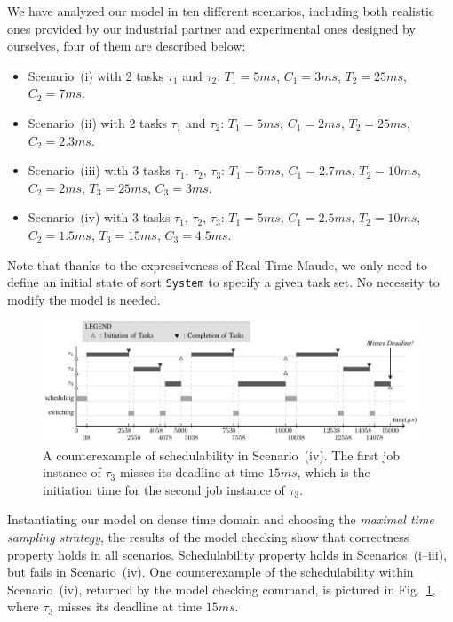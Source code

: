 \documentclass[12pt,onecolumn]{IEEEtranTIE}
\begin{document}
We have analyzed our model in ten different scenarios, including both
realistic ones provided by our industrial partner and experimental
ones designed by ourselves, four of them are described below:
\begin{itemize}
\item Scenario~(i) with 2 tasks $\tau_1$ and $\tau_2$: $T_1=5ms$,
  $C_1=3ms$, $T_2=25ms$, $C_2=7ms$.
\item Scenario~(ii) with 2 tasks $\tau_1$ and $\tau_2$: $T_1=5ms$,
  $C_1=2ms$, $T_2=25ms$, $C_2=2.3ms$.
\item Scenario~(iii) with 3 tasks $\tau_1$, $\tau_2$, $\tau_3$:
  $T_1=5ms$, $C_1=2.7ms$, $T_2=10ms$, $C_2=2ms$, $T_3=25ms$,
  $C_3=3ms$.
\item Scenario~(iv) with 3 tasks $\tau_1$, $\tau_2$, $\tau_3$:
  $T_1=5ms$, $C_1=2.5ms$, $T_2=10ms$, $C_2=1.5ms$,
  $T_3=15ms$, $C_3=4.5ms$.
\end{itemize}
Note that thanks to the expressiveness of Real-Time Maude, we
only need to define an initial state of sort \verb|System| to specify
a given task set. No necessity to modify the model is needed.


\begin{figure}[!t]
\centering
\includegraphics{FIG3_15-TIE-3480.pdf}
\caption{A counterexample of schedulability in Scenario~(iv). The first
  job instance of $\tau_3$ misses its deadline at time $15ms$, which
  is the initiation time for the second job instance of $\tau_3$.}
\label{f:counterexample}
\end{figure}

Instantiating our model on dense time domain and choosing the
\emph{maximal time sampling strategy}, the results of the model
checking show that correctness property holds in all scenarios.
Schedulability property holds in Scenarios~(i--iii), but fails in
Scenario~(iv).  One counterexample of the schedulability within
Scenario~(iv), returned by the model checking command, is pictured in
Fig.~\ref{f:counterexample}, where $\tau_3$ misses its deadline at
time $15ms$.
\end{document}
